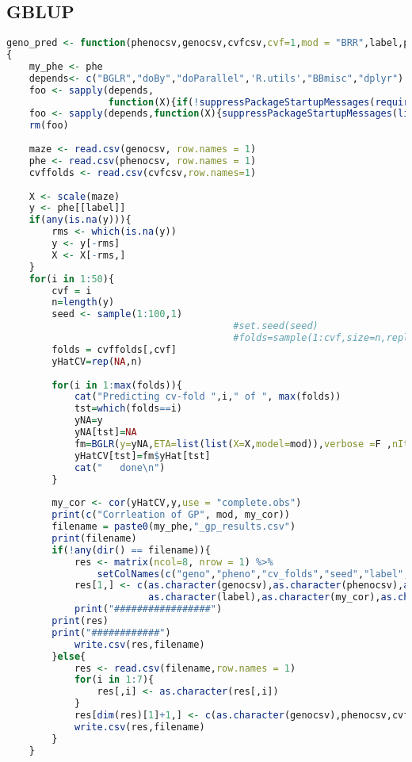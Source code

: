 \subsection{GBLUP}
\begin{lstlisting}[language=R]
    geno_pred <- function(phenocsv,genocsv,cvfcsv,cvf=1,mod = "BRR",label,phe)
{
    my_phe <- phe
    depends<- c("BGLR","doBy","doParallel",'R.utils',"BBmisc","dplyr")
    foo <- sapply(depends,
                  function(X){if(!suppressPackageStartupMessages(require(X,character.only = T))){install.packages(X)}})
    foo <- sapply(depends,function(X){suppressPackageStartupMessages(library(X,character.only=TRUE))})
    rm(foo) 
     
    maze <- read.csv(genocsv, row.names = 1)
    phe <- read.csv(phenocsv, row.names = 1)
    cvffolds <- read.csv(cvfcsv,row.names=1)
    
    X <- scale(maze)
    y <- phe[[label]]
    if(any(is.na(y))){
        rms <- which(is.na(y))
        y <- y[-rms]
        X <- X[-rms,]
    }
    for(i in 1:50){
        cvf = i
        n=length(y)
        seed <- sample(1:100,1)
                                        #set.seed(seed)
                                        #folds=sample(1:cvf,size=n,replace=T)
        folds = cvffolds[,cvf]
        yHatCV=rep(NA,n)
        
        for(i in 1:max(folds)){
            cat("Predicting cv-fold ",i," of ", max(folds))
            tst=which(folds==i)
            yNA=y
            yNA[tst]=NA
            fm=BGLR(y=yNA,ETA=list(list(X=X,model=mod)),verbose =F ,nIter=7000,burnIn=1000)
            yHatCV[tst]=fm$yHat[tst]
            cat("   done\n")
        }
        
        my_cor <- cor(yHatCV,y,use = "complete.obs")
        print(c("Corrleation of GP", mod, my_cor))
        filename = paste0(my_phe,"_gp_results.csv")
        print(filename)
        if(!any(dir() == filename)){
            res <- matrix(ncol=8, nrow = 1) %>%
                setColNames(c("geno","pheno","cv_folds","seed","label", "cor","method","nmark"))
            res[1,] <- c(as.character(genocsv),as.character(phenocsv),as.character(cvf),as.character(seed),
                         as.character(label),as.character(my_cor),as.character(mod),dim(X)[2])
            print("#################")
	    print(res)
	    print("############")
            write.csv(res,filename)
        }else{
            res <- read.csv(filename,row.names = 1)
            for(i in 1:7){
                res[,i] <- as.character(res[,i])
            }
            res[dim(res)[1]+1,] <- c(as.character(genocsv),phenocsv,cvf,seed,as.character(label),my_cor,mod,dim(X)[2])
            write.csv(res,filename)
        }
    }
    

\end{lstlisting}
